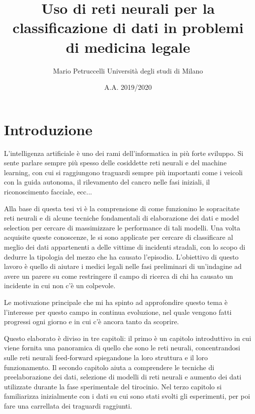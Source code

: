\documentclass[12pt, twoside, letterpaper]{report}
\title{Uso di reti neurali per la classificazione di dati in problemi di medicina legale}
\author{Mario Petruccelli \cr Università degli studi di Milano}
\date{A.A. 2019/2020}
\begin{document}
	\begin{titlepage}
		
		\newpage
		\tableofcontents
		\thispagestyle{empty}
	\end{titlepage}

	\chapter*{Introduzione}     
		L'intelligenza artificiale è uno dei rami dell'informatica in più forte sviluppo. Si sente  parlare sempre più spesso delle cosiddette reti neurali e del machine learning, con cui si raggiungono traguardi sempre più importanti come i veicoli con la guida autonoma, il rilevamento del cancro nelle fasi iniziali, il riconoscimento facciale, ecc... 

		Alla base di questa tesi vi è la comprensione di come funzionino le sopracitate reti neurali e di alcune tecniche fondamentali di elaborazione dei dati e model selection per cercare di massimizzare le performance di tali modelli. Una volta acquisite queste conoscenze, le si sono applicate per cercare di classificare al meglio dei dati appartenenti a delle vittime di incidenti stradali, con lo scopo di dedurre la tipologia del mezzo che ha causato l'episodio. L'obiettivo di questo lavoro è quello di aiutare i medici legali nelle fasi preliminari di un'indagine ad avere un parere su come restringere il campo di ricerca di chi ha causato un incidente in cui non c'è un colpevole. 

		Le motivazione principale che mi ha spinto ad approfondire questo tema è l'interesse per questo campo in continua evoluzione, nel quale vengono fatti progressi ogni giorno e in cui c'è ancora tanto da scoprire.

		Questo elaborato è diviso in tre capitoli: il primo è un capitolo introduttivo in cui viene fornita una panoramica di quello che sono le reti neurali, concentrandosi sulle reti neurali feed-forward spiegandone la loro struttura e il loro funzionamento. Il secondo capitolo aiuta a comprendere le tecniche di preelaborazione dei dati, selezione di modelli di reti neurali e aumento dei dati utilizzate durante la fase sperimentale del tirocinio. Nel terzo capitolo si familiarizza inizialmente con i dati su cui sono stati svolti gli esperimenti, per poi fare una carrellata dei traguardi raggiunti. 

		

		\newpage		
\end{document}
